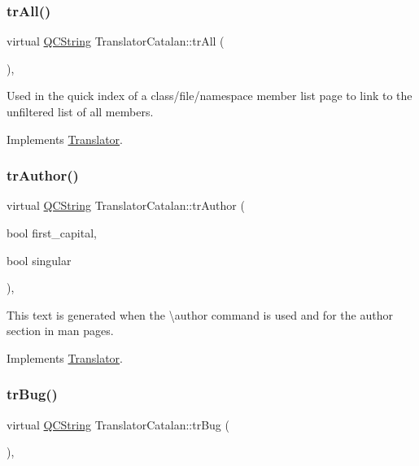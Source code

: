 \subsubsection{\texorpdfstring{trAll()}{trAll()}}
{\footnotesize\ttfamily virtual \mbox{\hyperlink{class_q_c_string}{Q\+C\+String}} Translator\+Catalan\+::tr\+All (\begin{DoxyParamCaption}{ }\end{DoxyParamCaption})\hspace{0.3cm}{\ttfamily [inline]}, {\ttfamily [virtual]}}

Used in the quick index of a class/file/namespace member list page to link to the unfiltered list of all members. 

Implements \mbox{\hyperlink{class_translator}{Translator}}.

\mbox{\label{class_translator_catalan_a9db36d4e8be276b45fcf4c428fa47910}} 
\subsubsection{\texorpdfstring{trAuthor()}{trAuthor()}}
{\footnotesize\ttfamily virtual \mbox{\hyperlink{class_q_c_string}{Q\+C\+String}} Translator\+Catalan\+::tr\+Author (\begin{DoxyParamCaption}\item[{bool}]{first\+\_\+capital,  }\item[{bool}]{singular }\end{DoxyParamCaption})\hspace{0.3cm}{\ttfamily [inline]}, {\ttfamily [virtual]}}

This text is generated when the \textbackslash{}author command is used and for the author section in man pages. 

Implements \mbox{\hyperlink{class_translator}{Translator}}.

\mbox{\label{class_translator_catalan_a223abadd8ce26194375c7329b441215a}} 
\subsubsection{\texorpdfstring{trBug()}{trBug()}}
{\footnotesize\ttfamily virtual \mbox{\hyperlink{class_q_c_string}{Q\+C\+String}} Translator\+Catalan\+::tr\+Bug (\begin{DoxyParamCaption}{ }\end{DoxyParamCaption})\hspace{0.3cm}{\ttfamily [inline]}, {\ttfamily [virtual]}}


